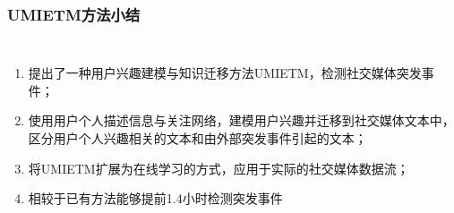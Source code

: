 \begin{frame}
\frametitle{UMIETM方法小结}	
\begin{columns}

\begin{enumerate}
	\item 提出了一种用户兴趣建模与知识迁移方法UMIETM，检测社交媒体突发事件；
	\item 使用用户个人描述信息与关注网络，建模用户兴趣并迁移到社交媒体文本中，区分用户个人兴趣相关的文本和由外部突发事件引起的文本；
	\item 将UMIETM扩展为在线学习的方式，应用于实际的社交媒体数据流；
	\item 相较于已有方法能够提前1.4小时检测突发事件
\end{enumerate}


\end{columns}

\end{frame}
